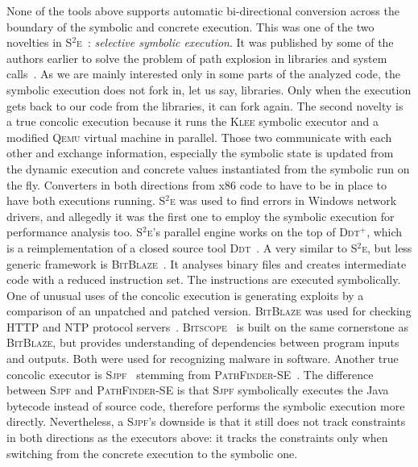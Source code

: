 None of the tools above supports automatic bi-directional conversion across
the boundary of the symbolic and concrete execution. This was one of the two
novelties in \textsc{S${}^2$e}~\cite{s2e}: \emph{selective symbolic
execution}. It was published by some of the authors earlier to solve the
problem of path explosion in libraries and system calls~\cite{se_selective}.
As we are mainly interested only in some parts of the analyzed code, the
symbolic execution does not fork in, let us say, libraries. Only when the
execution gets back to our code from the libraries, it can fork again.  The
second novelty is a true concolic execution because it runs the \textsc{Klee}
symbolic executor and a modified \textsc{Qemu} virtual machine in parallel.
Those two communicate with each other and exchange information, especially the
symbolic state is updated from the dynamic execution and concrete values
instantiated from the symbolic run on the fly. Converters in both directions
from x86 code to \llvm have to be in place to have both executions running.
\textsc{S${}^2$e} was used to find errors in Windows network drivers, and
allegedly it was the first one to employ the symbolic execution for
performance analysis too.  \textsc{S${}^2$e}'s parallel engine works on the
top of \textsc{Ddt${}^+$}, which is a reimplementation of a closed source tool
\textsc{Ddt}~\cite{ddt}. A very similar to \textsc{S${}^2$e}, but less generic
framework is \textsc{BitBlaze}~\cite{bitblaze}. It analyses binary files and
creates intermediate code with a reduced instruction set. The instructions are
executed symbolically.  One of unusual uses of the concolic execution is
generating exploits by a comparison of an unpatched and patched version.
\textsc{BitBlaze} was used for checking HTTP and NTP protocol
servers~\cite{bitblaze_net}.  \textsc{Bitscope}~\cite{bitscope} is built on
the same cornerstone as \textsc{BitBlaze}, but provides understanding of
dependencies between program inputs and outputs. Both were used for
recognizing malware in software.  Another true concolic executor is
\textsc{Sjpf}~\cite{sjpf} stemming from
\textsc{PathFinder-SE}~\cite{pathfinder_se}. The difference between
\textsc{Sjpf} and \textsc{PathFinder-SE} is that \textsc{Sjpf} symbolically
executes the Java bytecode instead of source code, therefore performs the
symbolic execution more directly. Nevertheless, a \textsc{Sjpf}'s downside is
that it still does not track constraints in both directions as the executors
above: it tracks the constraints only when switching from the concrete
execution to the symbolic one.

